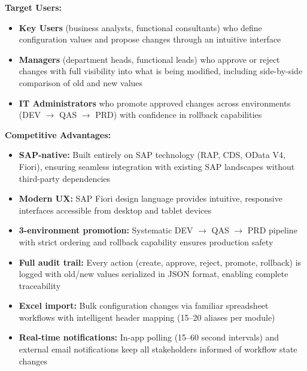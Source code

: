 \documentclass[12pt,a4paper]{report}
\begin{document}
\textbf{Target Users:}
\begin{itemize}[leftmargin=2em]
  \item \textbf{Key Users} (business analysts, functional consultants) who define configuration values and propose changes through an intuitive interface
  \item \textbf{Managers} (department heads, functional leads) who approve or reject changes with full visibility into what is being modified, including side-by-side comparison of old and new values
  \item \textbf{IT Administrators} who promote approved changes across environments (DEV $\rightarrow$ QAS $\rightarrow$ PRD) with confidence in rollback capabilities
\end{itemize}

\textbf{Competitive Advantages:}
\begin{itemize}[leftmargin=2em]
  \item \textbf{SAP-native:} Built entirely on SAP technology (RAP, CDS, OData V4, Fiori), ensuring seamless integration with existing SAP landscapes without third-party dependencies
  \item \textbf{Modern UX:} SAP Fiori design language provides intuitive, responsive interfaces accessible from desktop and tablet devices
  \item \textbf{3-environment promotion:} Systematic DEV $\rightarrow$ QAS $\rightarrow$ PRD pipeline with strict ordering and rollback capability ensures production safety
  \item \textbf{Full audit trail:} Every action (create, approve, reject, promote, rollback) is logged with old/new values serialized in JSON format, enabling complete traceability
  \item \textbf{Excel import:} Bulk configuration changes via familiar spreadsheet workflows with intelligent header mapping (15--20 aliases per module)
  \item \textbf{Real-time notifications:} In-app polling (15--60 second intervals) and external email notifications keep all stakeholders informed of workflow state changes
\end{itemize}
\end{document}
